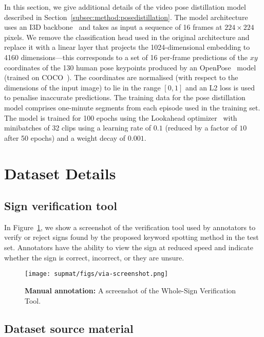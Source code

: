 In this section, we give additional details of the video pose distillation model described in
Section~\ref{subsec:method:posedistillation}.
The model architecture uses an I3D backbone~\cite{Carreira2017} and takes as input a sequence of 16 frames at $224\times224$ pixels. We remove the classification head used in the original architecture and replace it with a linear layer that projects the 1024-dimensional embedding to 4160 dimensions---this corresponds to a set of 16 per-frame predictions of the $xy$ coordinates of the 130 human pose keypoints produced by an OpenPose~\cite{cao2018openpose} model (trained on COCO~\cite{lin2014microsoft}).  The coordinates are normalised (with respect to the dimensions of the input image) to lie in the range $[0, 1]$ and an L2 loss is used to penalise inaccurate predictions.  The training data for the pose distillation model comprises one-minute segments from each episode used in the \datasetName{} training set.  The model is trained for 100 epochs using the Lookahead optimizer~\cite{zhang2019lookahead} with minibatches of 32 clips using a learning rate of $0.1$ (reduced by a factor of $10$ after 50 epochs) and a weight decay of $0.001$.  


\section{\datasetName{} Dataset Details} \label{app:sec:dataset}
\subsection{Sign verification tool}

In Figure~\ref{app:fig:verification-tool}, we show a screenshot of the verification tool used by annotators to verify or reject signs found by the proposed keyword spotting method in the test set.  Annotators have the ability to view the sign at reduced speed and indicate whether the sign is correct, incorrect, or they are unsure.

\begin{figure}[t]
    \centering
    \texttt{[image: supmat/figs/via-screenshot.png]}
    \caption{\textbf{Manual annotation:} A screenshot of the Whole-Sign Verification Tool.}
    \label{app:fig:verification-tool}
\end{figure}


\subsection{Dataset source material} \label{app:subsec:episodes}

